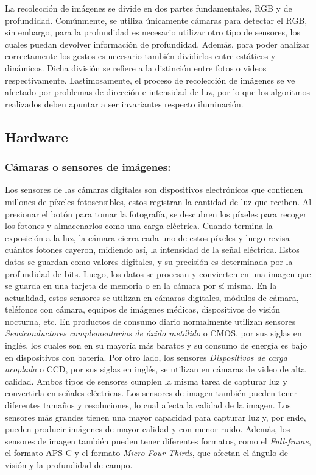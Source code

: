 La recolección de imágenes se divide en dos partes fundamentales, RGB y de profundidad. Comúnmente, se utiliza únicamente cámaras para detectar el RGB, sin embargo, para la profundidad es necesario utilizar otro tipo de sensores, los cuales puedan devolver información de profundidad. Además, para poder analizar correctamente los gestos es necesario también dividirlos entre estáticos y dinámicos. Dicha división se refiere a la distinción entre fotos o videos respectivamente. Lastimosamente, el proceso de recolección de imágenes se ve afectado por problemas de dirección e intensidad de luz, por lo que los algoritmos realizados deben apuntar a ser invariantes respecto iluminación. \cite{Wang_Jang_2018}



\subsection*{Hardware}
\subsubsection*{Cámaras o sensores de imágenes:}

Los sensores de las cámaras digitales son dispositivos electrónicos que contienen millones de píxeles fotosensibles, estos registran la cantidad de luz que reciben. Al presionar el botón para tomar la fotografía, se descubren los píxeles para recoger los fotones y almacenarlos como una carga eléctrica. Cuando termina la exposición a la luz, la cámara cierra cada uno de estos píxeles y luego revisa cuántos fotones cayeron, midiendo así, la intensidad de la señal eléctrica. Estos datos se guardan como valores digitales, y su precisión es determinada por la profundidad de bits. Luego, los datos se procesan y convierten en una imagen que se guarda en una tarjeta de memoria o en la cámara por sí misma. En la actualidad, estos sensores se utilizan en cámaras digitales, módulos de cámara, teléfonos con cámara, equipos de imágenes médicas, dispositivos de visión nocturna, etc. En productos de consumo diario normalmente utilizan sensores \textit{Semiconductores complementarios de óxido metálido} o CMOS, por sus siglas en inglés, los cuales son en su mayoría más baratos y su consumo de energía es bajo en dispositivos con batería. Por otro lado, los sensores \textit{Dispositivos de carga acoplada} o CCD, por sus siglas en inglés, se utilizan en cámaras de video de alta calidad. Ambos tipos de sensores cumplen la misma tarea de capturar luz y convertirla en señales eléctricas. Los sensores de imagen también pueden tener diferentes tamaños y resoluciones, lo cual afecta la calidad de la imagen. Los sensores más grandes tienen una mayor capacidad para capturar luz y, por ende, pueden producir imágenes de mayor calidad y con menor ruido. Además, los sensores de imagen también pueden tener diferentes formatos, como el \textit{Full-frame}, el formato APS-C y el formato \textit{Micro Four Thirds}, que afectan el ángulo de visión y la profundidad de campo. \cite{RadhaKrishna}

